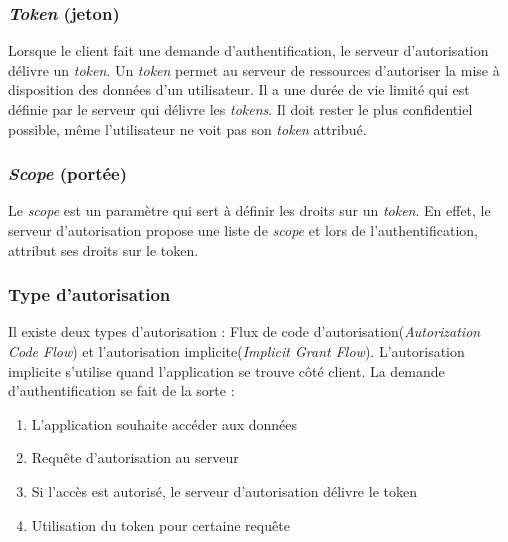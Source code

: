 \documentclass[11pt]{report} %
\begin{document}
			\subsubsection{\textit{Token} (jeton)}
			\label{token}
			Lorsque le client fait une demande d'authentification, le serveur d'autorisation délivre un \textit{token}. Un \textit{token} permet au serveur de ressources d'autoriser la mise à disposition des données d'un utilisateur. Il a une durée de vie limité qui est définie par le serveur qui délivre les \textit{tokens}.
			Il doit rester le plus confidentiel possible, même l'utilisateur ne voit pas son \textit{token} attribué.
			
			\subsubsection{\textit{Scope} (portée)}
			Le \textit{scope} est un paramètre qui sert à définir les droits sur un \textit{token}. En effet, le serveur d'autorisation propose une liste de \textit{scope} et lors de l'authentification, attribut ses droits sur le token.
			
			\subsubsection{Type d'autorisation}
			Il existe deux types d'autorisation : Flux de code d'autorisation(\textit{Autorization Code Flow}) et l'autorisation implicite(\textit{Implicit Grant Flow}). L'autorisation implicite s'utilise quand l'application se trouve côté client. La demande d'authentification se fait de la sorte :
			\begin{enumerate}
				\item L'application souhaite accéder aux données
				\item Requête d'autorisation au serveur
				\item Si l'accès est autorisé, le serveur d'autorisation délivre le token
				\item Utilisation du token pour certaine requête 
			\end{enumerate}
			
			\newpage
			
\end{document}
